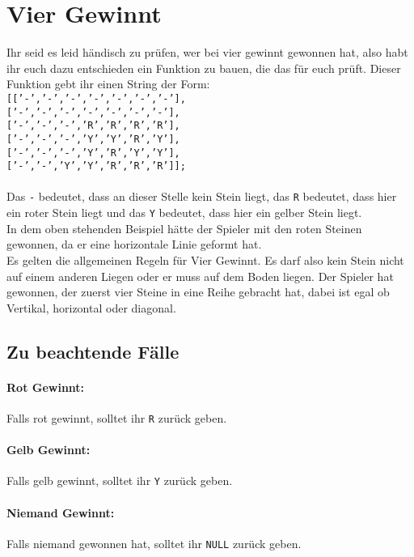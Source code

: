 \documentclass[a4paper]{article}
\author{Jochen Saalfeld}
\begin{document}
\section*{Vier Gewinnt}
Ihr seid es leid händisch zu prüfen, wer bei vier gewinnt gewonnen hat, also habt ihr euch dazu entschieden ein Funktion zu bauen, die das für euch prüft. Dieser Funktion gebt ihr einen String der Form:\\
\texttt{[['-','-','-','-','-','-','-'],}\\
\texttt{['-','-','-','-','-','-','-'],}\\
\texttt{['-','-','-','R','R','R','R'],}\\
\texttt{['-','-','-','Y','Y','R','Y'],}\\
\texttt{['-','-','-','Y','R','Y','Y'],}\\
\texttt{['-','-','Y','Y','R','R','R']];}\\
\\
Das \texttt{-} bedeutet, dass an dieser Stelle kein Stein liegt, das \texttt{R} bedeutet, dass hier ein roter Stein liegt und das \texttt{Y} bedeutet, dass hier ein gelber Stein liegt.\\
In dem oben stehenden Beispiel hätte der Spieler mit den roten Steinen gewonnen, da er eine horizontale Linie geformt hat.\\
Es gelten die allgemeinen Regeln für Vier Gewinnt. Es darf also kein Stein nicht auf einem anderen Liegen oder er muss auf dem Boden liegen. Der Spieler hat gewonnen, der zuerst vier Steine in eine Reihe gebracht hat, dabei ist egal ob Vertikal, horizontal oder diagonal.\\
\subsection*{Zu beachtende Fälle}
\paragraph{Rot Gewinnt:} Falls rot gewinnt, solltet ihr \texttt{R} zurück geben.
\paragraph{Gelb Gewinnt:} Falls gelb gewinnt, solltet ihr \texttt{Y} zurück geben.
\paragraph{Niemand Gewinnt:} Falls niemand gewonnen hat, solltet ihr \texttt{NULL} zurück geben.
\end{document}
